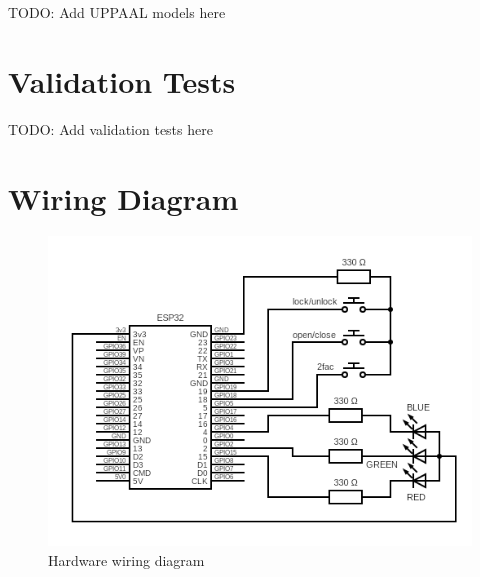 TODO: Add UPPAAL models here

\section{Validation Tests}
\label{app:ValidationTests}

TODO: Add validation tests here

\section{Wiring Diagram}
\label{app:WiringDiagram}

\begin{figure}[tbh]
\includegraphics[width=.95\textwidth]{./../circuit/circuit.png}
\caption{Hardware wiring diagram}
\label{app:fig:WiringDiagram}
\end{figure}